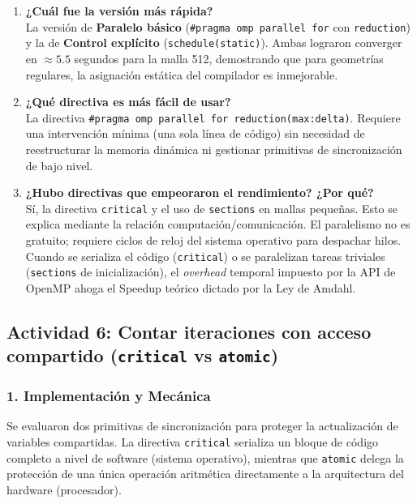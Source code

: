 \documentclass[11pt,a4paper]{article}
\begin{document}
\begin{enumerate}
    \item \textbf{¿Cuál fue la versión más rápida?} \\
    La versión de \textbf{Paralelo básico} (\texttt{\#pragma omp parallel for} con \texttt{reduction}) y la de \textbf{Control explícito} (\texttt{schedule(static)}). Ambas lograron converger en $\approx \mathbf{5.5}$ segundos para la malla 512, demostrando que para geometrías regulares, la asignación estática del compilador es inmejorable.

    \item \textbf{¿Qué directiva es más fácil de usar?} \\
    La directiva \texttt{\#pragma omp parallel for reduction(max:delta)}. Requiere una intervención mínima (una sola línea de código) sin necesidad de reestructurar la memoria dinámica ni gestionar primitivas de sincronización de bajo nivel.

    \item \textbf{¿Hubo directivas que empeoraron el rendimiento? ¿Por qué?} \\
    Sí, la directiva \texttt{critical} y el uso de \texttt{sections} en mallas pequeñas. Esto se explica mediante la relación computación/comunicación. El paralelismo no es gratuito; requiere ciclos de reloj del sistema operativo para despachar hilos. Cuando se serializa el código (\texttt{critical}) o se paralelizan tareas triviales (\texttt{sections} de inicialización), el \textit{overhead} temporal impuesto por la API de OpenMP ahoga el Speedup teórico dictado por la Ley de Amdahl.
\end{enumerate}


\subsection*{Actividad 6: Contar iteraciones con acceso compartido (\texttt{critical} vs \texttt{atomic})}

\subsubsection*{1. Implementación y Mecánica}
Se evaluaron dos primitivas de sincronización para proteger la actualización de variables compartidas. La directiva \texttt{critical} serializa un bloque de código completo a nivel de software (sistema operativo), mientras que \texttt{atomic} delega la protección de una única operación aritmética directamente a la arquitectura del hardware (procesador).
\end{document}
